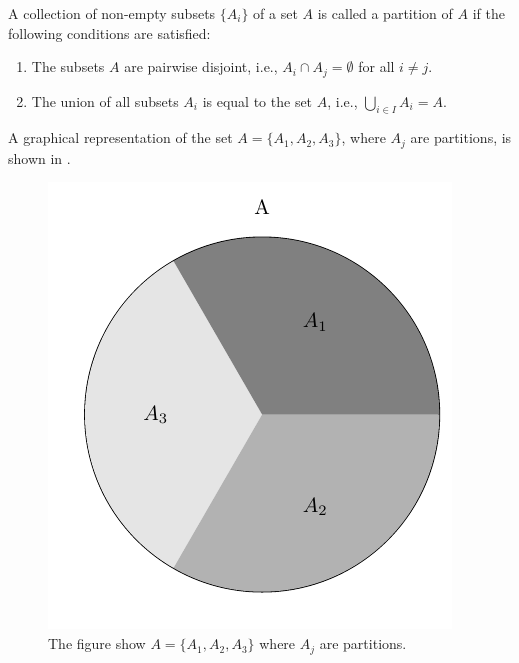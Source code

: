 \begin{definition}[Partition]
	A collection of non-empty subsets $\{A_i\}$ of a set $A$ is called a partition of $A$ if the following conditions are satisfied:
	\begin{enumerate}
		\item The subsets $A$ are pairwise disjoint, i.e., $A_i \cap A_j = \emptyset$ for all \(i \neq j\).
		\item The union of all subsets \(A_i\) is equal to the set \(A\), i.e., \(\bigcup_{i \in I} A_i = A\).
	\end{enumerate}
	
	A graphical representation of the set $A=\{A_1,A_2,A_3\}$, where $A_j$ are partitions, is shown in .
	\begin{figure}[h]
		\centering
		\includegraphics[]{figures/set_partition.pdf}
		\caption{The figure show $A=\{A_1,A_2,A_3\}$ where $A_j$ are partitions.}
		\label{fig:set_partition}
	\end{figure}
\end{definition}






	
